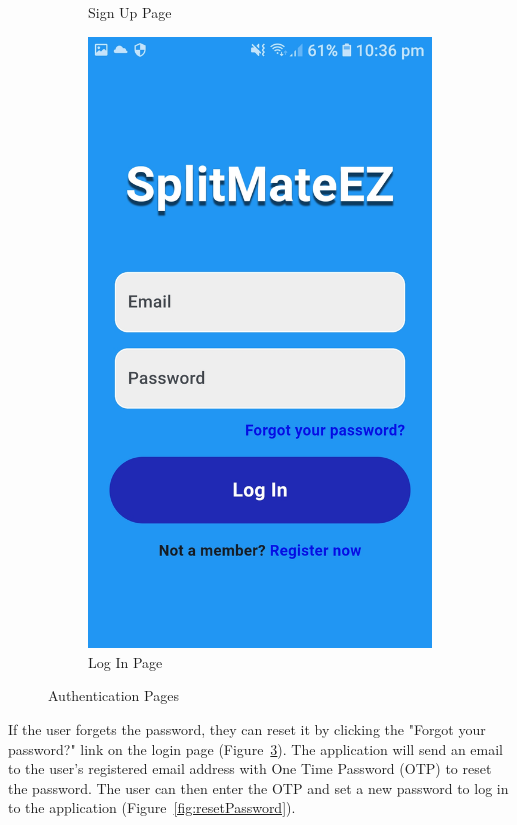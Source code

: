 \documentclass[sigconf]{acmart}
\begin{document}
\begin{figure}[h]
\begin{subfigure}{0.24\textwidth}
    \caption{Sign Up Page}
    \label{fig:signUp}
  \end{subfigure}
  \begin{subfigure}{0.24\textwidth}
    \raggedleft
    \includegraphics[width=\linewidth]{logIn.jpg}
    \caption{Log In Page}
    \label{fig:logIn}
  \end{subfigure}
  \caption{Authentication Pages}
\end{figure}

If the user forgets the password, they can reset it by clicking the "Forgot your password?" link on the login page (Figure~\ref{fig:logIn}). The application will send an email to the user's registered email address with One Time Password (OTP) to reset the password. The user can then enter the OTP and set a new password to log in to the application (Figure~\ref{fig:resetPassword}).
\end{document}
